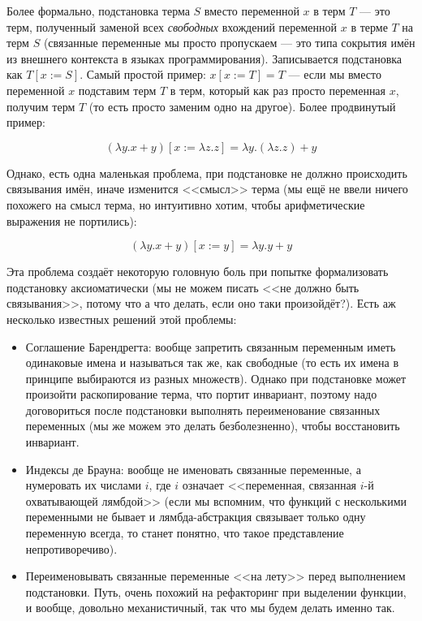\documentclass{../../text-style}
\begin{document}
Более формально, подстановка терма $S$ вместо переменной $x$ в терм $T$ --- это терм, полученный заменой всех \textit{свободных} вхождений переменной $x$ в терме $T$ на терм $S$ (связанные переменные мы просто пропускаем --- это типа сокрытия имён из внешнего контекста в языках программирования). Записывается подстановка как $T[x := S]$. Самый простой пример:  $x[x := T] = T$ --- если мы вместо переменной $x$ подставим терм $T$ в терм, который как раз просто переменная $x$, получим терм $T$ (то есть просто заменим одно на другое). Более продвинутый пример:

$$(\lambda y.x + y)[x := \lambda z.z] = \lambda y. (\lambda z.z) + y$$

Однако, есть одна маленькая проблема, при подстановке не должно происходить связывания имён, иначе изменится <<смысл>> терма (мы ещё не ввели ничего похожего на смысл терма, но интуитивно хотим, чтобы арифметические выражения не портились):

$$(\lambda y.x + y)[x := y] = \lambda y. y + y$$

Эта проблема создаёт некоторую головную боль при попытке формализовать подстановку аксиоматически (мы не можем писать <<не должно быть связывания>>, потому что а что делать, если оно таки произойдёт?). Есть аж несколько известных решений этой проблемы:

\begin{itemize}
    \item Соглашение Барендрегта: вообще запретить связанным переменным иметь одинаковые имена и называться так же, как свободные (то есть их имена в принципе выбираются из разных множеств). Однако при подстановке может произойти раскопирование терма, что портит инвариант, поэтому надо договориться после подстановки выполнять переименование связанных переменных (мы же можем это делать безболезненно), чтобы восстановить инвариант.
    \item Индексы де Брауна: вообще не именовать связанные переменные, а нумеровать их числами $i$, где $i$ означает <<переменная, связанная $i$-й охватывающей лямбдой>>  (если мы вспомним, что функций с несколькими переменными не бывает и лямбда-абстракция связывает только одну переменную всегда, то станет понятно, что такое представление непротиворечиво).
    \item Переименовывать связанные переменные <<на лету>> перед выполнением подстановки. Путь, очень похожий на рефакторинг при выделении функции, и вообще, довольно механистичный, так что мы будем делать именно так.
\end{itemize}
\end{document}
